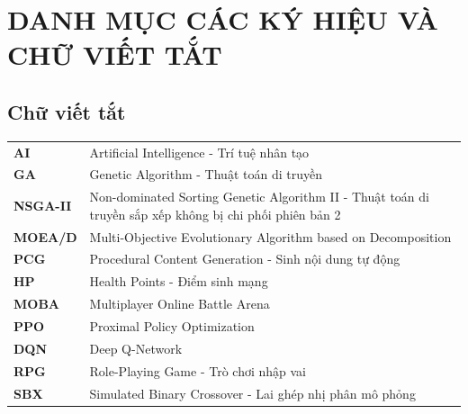 \clearpage
{}
\chapter*{DANH MỤC CÁC KÝ HIỆU VÀ CHỮ VIẾT TẮT}

\section*{Chữ viết tắt}
\begin{tabularx}{\textwidth}{l X}
    \textbf{AI} & Artificial Intelligence - Trí tuệ nhân tạo \\
    \textbf{GA} & Genetic Algorithm - Thuật toán di truyền \\
    \textbf{NSGA-II} & Non-dominated Sorting Genetic Algorithm II - Thuật toán di truyền sắp xếp không bị chi phối phiên bản 2 \\
    \textbf{MOEA/D} & Multi-Objective Evolutionary Algorithm based on Decomposition \\
    \textbf{PCG} & Procedural Content Generation - Sinh nội dung tự động \\
    \textbf{HP} & Health Points - Điểm sinh mạng \\
    \textbf{MOBA} & Multiplayer Online Battle Arena \\
    \textbf{PPO} & Proximal Policy Optimization \\
    \textbf{DQN} & Deep Q-Network \\
    \textbf{RPG} & Role-Playing Game - Trò chơi nhập vai \\
    \textbf{SBX} & Simulated Binary Crossover - Lai ghép nhị phân mô phỏng \\
\end{tabularx}

\vspace{1cm}

